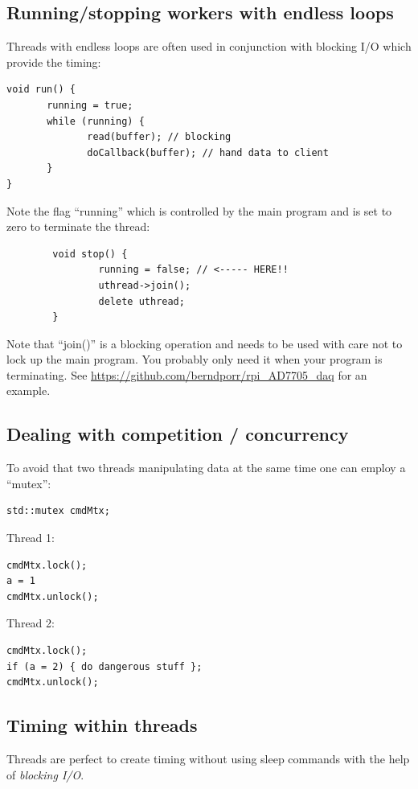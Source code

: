 \documentclass[12pt]{report}
\begin{document}
\subsection{Running/stopping workers with endless loops}
Threads with endless loops are often used in conjunction with blocking
I/O which provide the timing:
\begin{verbatim}
void run() {
       running = true;
       while (running) {
              read(buffer); // blocking
              doCallback(buffer); // hand data to client
       }
}
\end{verbatim}
Note the flag ``running'' which is controlled by the main program and is set to zero to terminate
the thread:
\begin{verbatim}
        void stop() {
                running = false; // <----- HERE!!
                uthread->join();
                delete uthread;
        }
\end{verbatim}
Note that ``join()'' is a blocking operation and needs to be used with care not to
lock up the main program. You probably only need it when your program is terminating.
See \url{https://github.com/berndporr/rpi_AD7705_daq} for an example.


\subsection{Dealing with competition / concurrency}

To avoid that two threads manipulating data at the same
time one can employ a ``mutex'':

\begin{verbatim}
std::mutex cmdMtx;
\end{verbatim}

Thread 1:
\begin{verbatim}
cmdMtx.lock();
a = 1
cmdMtx.unlock();
\end{verbatim}

Thread 2:
\begin{verbatim}
cmdMtx.lock();
if (a = 2) { do dangerous stuff };
cmdMtx.unlock();
\end{verbatim}




\subsection{Timing within threads}
Threads are perfect to create timing without using sleep commands
with the help of \textsl{blocking I/O}.
\end{document}
